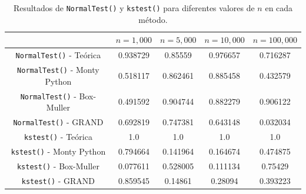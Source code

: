 \begin{table}[ht!]
    \centering
    \begin{tabular}{|c|c|c|c|c|}
        \hline
                                             & $n = 1,000$ & $n = 5,000$ & $n = 10,000$ & $n = 100,000$ \\
        \hline
        \texttt{NormalTest()} - Teórica      & 0.938729    & 0.85559     & 0.976657     & 0.716287      \\
        \texttt{NormalTest()} - Monty Python & 0.518117    & 0.862461    & 0.885458     & 0.432579      \\
        \texttt{NormalTest()} - Box-Muller   & 0.491592    & 0.904744    & 0.882279     & 0.906122      \\
        \texttt{NormalTest()} - GRAND        & 0.692819    & 0.747381    & 0.643148     & 0.032034      \\
        \hline
        \texttt{kstest()} - Teórica          & 1.0         & 1.0         & 1.0          & 1.0           \\
        \texttt{kstest()} - Monty Python     & 0.794664    & 0.141964    & 0.164674     & 0.474875      \\
        \texttt{kstest()} - Box-Muller       & 0.077611    & 0.528005    & 0.111134     & 0.75429       \\
        \texttt{kstest()} - GRAND            & 0.859545    & 0.14861     & 0.28094      & 0.393223      \\
        \hline
    \end{tabular}
    \caption{Resultados de \texttt{NormalTest()} y \texttt{kstest()} para diferentes valores de $n$ en cada método.}
\end{table}

% 


% 
% 
